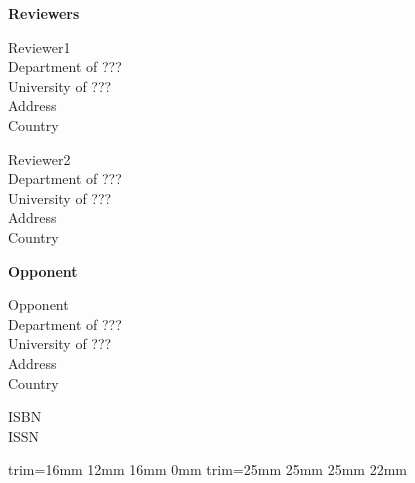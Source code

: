 \documentclass{tucsdissertation}
\begin{document}
\bigskip
\noindent \textbf{\Large Reviewers} \\ \mbox{}

 \parbox[t]{12 cm}{
  Reviewer1\\
  Department of ??? \\
  University of ??? \\
  Address \\
  Country \\ \mbox{}
}

 \parbox[t]{12 cm}{
  Reviewer2\\
  Department of ??? \\
  University of ??? \\
  Address \\
  Country \\ \mbox{}
}

\bigskip
\noindent \textbf{\Large Opponent} \\ \mbox{}

 \parbox[t]{12 cm}{
  Opponent\\
  Department of ??? \\
  University of ??? \\
  Address \\
  Country \\ \mbox{}
}

\vfill
\noindent \parbox[t]{12 cm}{
  ISBN \theisbn \\ 
  ISSN \theissn
}
\clearpage

\pagestyle{plain}
\setcounter{page}{1}


\clearpage



\clearpage

%

\clearpage

\tableofcontents
\cleardoublepage





%
%




\nobibliography*

{trim=16mm 12mm 16mm 0mm}
{trim=25mm 25mm 25mm 22mm}
\end{document}
